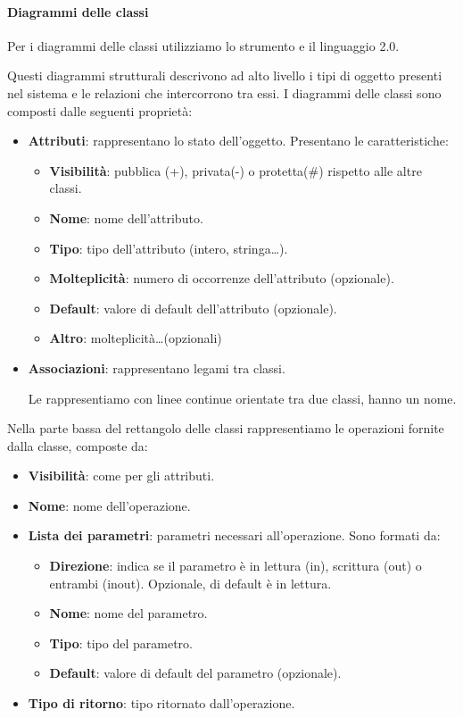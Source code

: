		\paragraph{Diagrammi delle classi}\label{PP:Sviluppo:DiagrammiClassi}
		Per i diagrammi delle classi utilizziamo lo strumento  e il linguaggio  2.0.\par
        Questi diagrammi strutturali descrivono ad alto livello i tipi di oggetto presenti nel sistema e le relazioni che intercorrono tra essi.
		I diagrammi delle classi sono composti dalle seguenti proprietà:
		\begin{itemize}
			\item \textbf{Attributi}: rappresentano lo stato dell'oggetto. Presentano le caratteristiche:
			    \begin{itemize}
			        \item \textbf{Visibilità}: pubblica (+), privata(-) o protetta(\#) rispetto alle altre classi.
			        \item \textbf{Nome}: nome dell'attributo.
			        \item \textbf{Tipo}: tipo dell'attributo (intero, stringa\dots).
			        \item \textbf{Molteplicità}: numero di occorrenze dell'attributo (opzionale).
			        \item \textbf{Default}: valore di default dell'attributo (opzionale).
                    \item \textbf{Altro}: molteplicità\dots (opzionali)
			    \end{itemize}
			\item \textbf{Associazioni}: rappresentano legami tra classi.\par
                        Le rappresentiamo con linee continue orientate tra due classi, hanno un nome.
		\end{itemize}
        Nella parte bassa del rettangolo delle classi rappresentiamo le operazioni fornite dalla classe, composte da:
        \begin{itemize}
            \item \textbf{Visibilità}: come per gli attributi.
            \item \textbf{Nome}: nome dell'operazione.
            \item \textbf{Lista dei parametri}: parametri necessari all'operazione. Sono formati da:
            \begin{itemize}
                \item \textbf{Direzione}: indica se il parametro è in lettura (in), scrittura (out) o entrambi (inout). Opzionale, di default è in lettura.
                \item \textbf{Nome}: nome del parametro.
                \item \textbf{Tipo}: tipo del parametro.
                \item \textbf{Default}: valore di default del parametro (opzionale).
            \end{itemize}
            \item \textbf{Tipo di ritorno}: tipo ritornato dall'operazione.
        \end{itemize}
